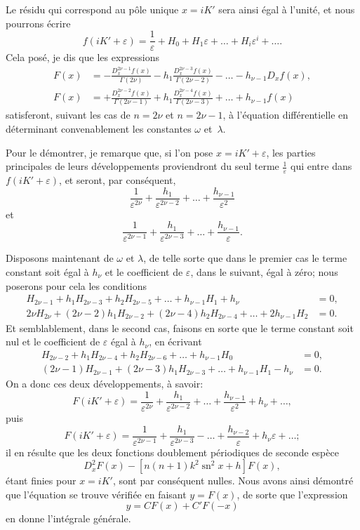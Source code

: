 \documentclass[11pt,leqno,oneside,letterpaper]{book}[2005/09/16]
\DeclareMathOperator{\sn}{sn}
\begin{document}
Le r\'esidu qui correspond au p\^ole unique $x = iK'$ sera ainsi \'egal \`a
l'unit\'e, et nous pourrons \'ecrire
\[
f(iK' + \varepsilon) = \frac{1}{\varepsilon} + H_0 + H_1\varepsilon + \ldots + H_i\varepsilon^i + \ldots.
\]
Cela pos\'e, je dis que les expressions
\begin{align*}
F(x) &= -   \frac{D_x^{2\nu-1} f(x)}{\Gamma(2\nu    )}
    -h_1\frac{D_x^{2\nu-3} f(x)}{\Gamma(2\nu - 2)}
    - \ldots - h_{\nu-1} D_x f(x), \\
F(x) &= +   \frac{D_x^{2\nu-2} f(x)}{\Gamma(2\nu - 1)}
    +h_1\frac{D_x^{2\nu-4}   f(x)}{\Gamma(2\nu - 3)}
    + \ldots + h_{\nu-1} f(x)
\end{align*}
satisferont, suivant les cas de $n = 2\nu$ et $n = 2\nu - 1$, \`a l'\'equation diff\'erentielle
en d\'eterminant convenablement les constantes $\omega$ et~$\lambda$.

Pour le d\'emontrer, je remarque que, si l'on pose $x = iK' + \varepsilon$, les
parties principales de leurs d\'eveloppements proviendront du seul terme $\frac{1}{\varepsilon}$
qui entre dans $f(iK' + \varepsilon)$, et seront, par cons\'equent,
\[
\frac{1}{\varepsilon^{2\nu}} + \frac{h_1}{\varepsilon^{2\nu-2}} + \ldots + \frac{h_{\nu-1}}{\varepsilon^2}
\]
et
\[
\frac{1}{\varepsilon^{2\nu-1}} + \frac{h_1}{\varepsilon^{2\nu-3}} + \ldots + \frac{h_{\nu-1}}{\varepsilon}.
\]

Disposons maintenant de $\omega$ et $\lambda$, de telle sorte que dans le premier
cas le terme constant soit \'egal \`a $h_{\nu}$ et le coefficient de $\varepsilon$, dans le suivant,
\'egal \`a z\'ero; nous poserons pour cela les conditions
\begin{align*}
H_{2\nu-1} + h_1 H_{2\nu-3} + h_2 H_{2\nu-5} + \ldots + h_{\nu-1} H_1 + h_{\nu} &= 0, \\
2\nu H_{2\nu} + (2\nu-2) h_1 H_{2\nu-2} + (2\nu-4) h_2 H_{2\nu-4} + \ldots + 2 h_{\nu-1} H_2 &= 0.
\end{align*}
Et semblablement, dans le second cas, faisons en sorte que le terme constant
soit nul et le coefficient de $\varepsilon$ \'egal \`a $h_{\nu}$, en \'ecrivant\label{page123a}
\begin{align*}
H_{2\nu-2} + h_1 H_{2\nu-4} + h_2 H_{2\nu-6} + \ldots + h_{\nu-1} H_0 &= 0,\\
(2\nu-1) H_{2\nu-1} + (2\nu-3) h_1 H_{2\nu-3} + \ldots + h_{\nu-1} H_1 - h_{\nu} &= 0.
\end{align*}
On a donc ces deux d\'eveloppements, \`a savoir:
\[
F(iK' + \varepsilon) = \frac{1}{\varepsilon^{2\nu}}
    + \frac{h_1}{\varepsilon^{2\nu-2}} + \ldots
    + \frac{h_{\nu-1}}{\varepsilon^2} + h_{\nu} + \ldots,
\]
puis
\[
F(iK' + \varepsilon) = \frac{1}{\varepsilon^{2\nu-1}}
    + \frac{h_1}{\varepsilon^{2\nu-3}} - \ldots
    + \frac{h_{\nu-2}}{\varepsilon} + h_{\nu} \varepsilon + \ldots;
\]
il en r\'esulte que les deux fonctions doublement p\'eriodiques de seconde
esp\`ece
\[
D_x^2 F(x) - \left[n(n+1) k^2 \sn^2 x + h \right] F(x),
\]
\'etant finies pour $x=iK'$, sont par cons\'equent nulles. Nous avons ainsi
d\'emontr\'e que l'\'equation se trouve v\'erifi\'ee en faisant $y=F(x)$, de sorte
que l'expression
\[
y = CF(x) + C'F(-x)
\]
en donne l'int\'egrale g\'en\'erale.
\end{document}
